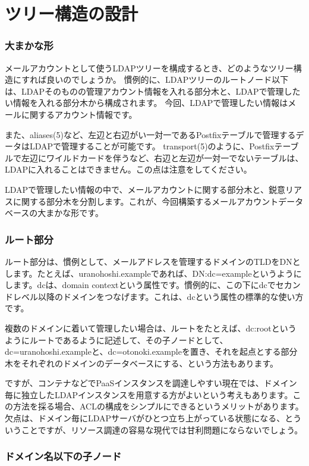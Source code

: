 \chapter{ツリー構造の設計}

\subsection{大まかな形}

メールアカウントとして使うLDAPツリーを構成するとき、どのようなツリー構造にすれば良いのでしょうか。
慣例的に、LDAPツリーのルートノード以下は、LDAPそのものの管理アカウント情報を入れる部分木と、LDAPで管理したい情報を入れる部分木から構成されます。
今回、LDAPで管理したい情報はメールに関するアカウント情報です。

また、aliases(5)など、左辺と右辺がい一対一であるPostfixテーブルで管理するデータはLDAPで管理することが可能です。
transport(5)のように、Postfixテーブルで左辺にワイルドカードを伴うなど、右辺と左辺が一対一でないテーブルは、LDAPに入れることはできません。この点は注意をしてください。

LDAPで管理したい情報の中で、メールアカウントに関する部分木と、鋭意リアスに関する部分木を分割します。これが、今回構築するメールアカウントデータベースの大まかな形です。

\subsection{ルート部分}

ルート部分は、慣例として、メールアドレスを管理するドメインのTLDをDNとします。たとえば、uranohoshi.exampleであれば、DN:dc=exampleというようにします。dcは、domain contextという属性です。慣例的に、この下にdcでセカンドレベル以降のドメインをつなげます。これは、dcという属性の標準的な使い方です。

複数のドメインに着いて管理したい場合は、ルートをたとえば、dc:rootというようにルートであるように記述して、その子ノードとして、dc=uranohoshi.exampleと、dc=otonoki.exampleを置き、それを起点とする部分木をそれぞれのドメインのデータベースにする、という方法もあります。

ですが、コンテナなどでPaaSインスタンスを調達しやすい現在では、ドメイン毎に独立したLDAPインスタンスを用意する方がよいという考えもあります。この方法を採る場合、ACLの構成をシンプルにできるというメリットがあります。欠点は、ドメイン毎にLDAPサーバがひとつ立ち上がっている状態になる、とういうことですが、リソース調達の容易な現代では甘利問題にならないでしょう。

\subsection{ドメイン名以下の子ノード}

